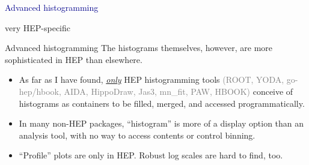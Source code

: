 \documentclass[aspectratio=169]{beamer}
\begin{document}

\begin{frame}{}
\huge
\vspace{0.5 cm}
\begin{center}
\textcolor{darkblue}{Advanced histogramming}

\large
\vspace{0.5 cm}
very HEP-specific
\end{center}
\end{frame}

\begin{frame}{Advanced histogramming}
\Large
\vspace{0.5 cm}
The histograms themselves, however, are more sophisticated in HEP than elsewhere.

\large
\vspace{0.35 cm}
\begin{itemize}\setlength{\itemsep}{0.35 cm}
\item<2-> As far as I have found, \underline{\it only} HEP histogramming tools \textcolor{gray}{(ROOT, YODA, go-hep/hbook, AIDA, HippoDraw, Jas3, mn\_fit, PAW, HBOOK)} conceive of histograms as containers to be filled, merged, and accessed programmatically.
\item<3-> In many non-HEP packages, ``histogram'' is more of a display option than an analysis tool, with no way to access contents or control binning.
\item<4-> ``Profile'' plots are only in HEP. Robust log scales are hard to find, too.
\end{itemize}
\begin{center}
\end{center}
\end{frame}
\end{document}
